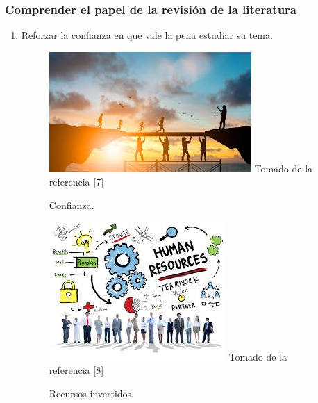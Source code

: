 \documentclass{beamer}
\newcounter{sauvegardeenumi}
\newcommand{\suite}{\setcounter{enumi}{\thesauvegardeenumi}}
\begin{document}
     \begin{frame}
        \frametitle{Comprender el papel de la revisi\'on de la literatura} 
            \begin{enumerate}
                \suite
                \item Reforzar la confianza en que vale la pena estudiar su tema.
                \begin{multicols}{2}
                    \begin{figure}
                        \includegraphics[scale=0.50]{figures/confianza}
                        \newline
                        {\tiny Tomado de la referencia [7] }
                        \caption{ Confianza. }
                    \end{figure}

                    \begin{figure}
                        \includegraphics[scale=0.50]{figures/recursos}
                        \newline
                        {\tiny Tomado de la referencia [8] }
                        \caption{ Recursos invertidos. }
                    \end{figure}
                \end{multicols}
            \end{enumerate}       
    \end{frame}
\end{document}
